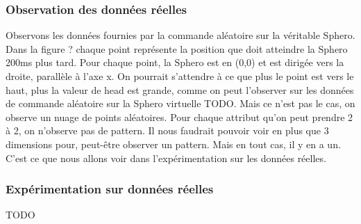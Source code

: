 \subsubsection{Observation des données réelles}
Observons les données fournies par la commande aléatoire sur la véritable Sphero.
Dans la figure ? chaque point représente la position que doit atteindre la Sphero 200ms plus tard.
Pour chaque point, la Sphero est en (0,0) et est dirigée vers la droite, parallèle à l'axe x.
On pourrait s'attendre à ce que plus le point est vers le haut, plus la valeur de head est grande, comme on peut l'observer sur les données de commande aléatoire sur la Sphero virtuelle TODO.
Mais ce n'est pas le cas, on observe un nuage de points aléatoires.
Pour chaque attribut qu'on peut prendre 2 à 2, on n'observe pas de pattern.
Il nous faudrait pouvoir voir en plus que 3 dimensions pour, peut-être observer un pattern.
Mais en tout cas, il y en a un.
C'est ce que nous allons voir dans l'expérimentation sur les données réelles.

\subsubsection{Expérimentation sur données réelles}
TODO\\
